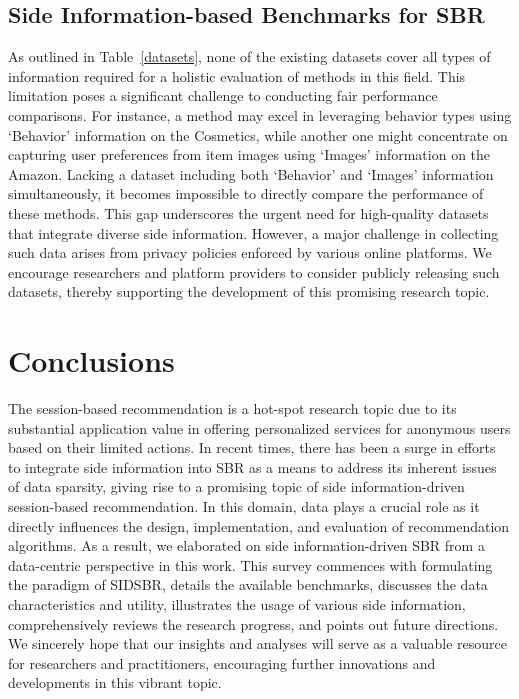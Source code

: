\documentclass[lettersize,journal]{IEEEtran}
\newcommand{\baby}{{SIDSBR}\xspace}
\begin{document}
\subsection{Side Information-based Benchmarks for SBR}
As outlined in Table~\ref{datasets}, none of the existing datasets cover all types of information required for a holistic evaluation of methods in this field. This limitation poses a significant challenge to conducting fair performance comparisons. For instance, a method may excel in leveraging behavior types using `Behavior' information on the Cosmetics, while another one might concentrate on capturing user preferences from item images using `Images' information on the Amazon. Lacking a dataset including both `Behavior' and `Images' information simultaneously, it becomes impossible to directly compare the performance of these methods. This gap underscores the urgent need for high-quality datasets that integrate diverse side information. However, a major challenge in collecting such data arises from privacy policies enforced by various online platforms. We encourage researchers and platform providers to consider publicly releasing such datasets, thereby supporting the development of this promising research topic.


\section{Conclusions}\label{conclusion}
The session-based recommendation is a hot-spot research topic due to its substantial application value in offering personalized services for anonymous users based on their limited actions. In recent times, there has been a surge in efforts to integrate side information into SBR as a means to address its inherent issues of data sparsity, giving rise to a promising topic of side information-driven session-based recommendation. In this domain, data plays a crucial role as it directly influences the design, implementation, and evaluation of recommendation algorithms. As a result, we elaborated on side information-driven SBR from a data-centric perspective in this work. This survey commences with formulating the paradigm of \baby, details the available benchmarks, discusses the data characteristics and utility, illustrates the usage of various side information, comprehensively reviews the research progress, and points out future directions. We sincerely hope that our insights and analyses will serve as a valuable resource for researchers and practitioners, encouraging further innovations and developments in this vibrant topic.
\end{document}
